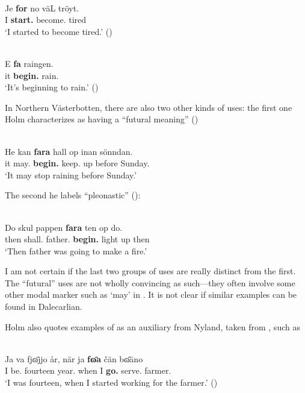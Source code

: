 \ea\label{}
\\
\gll Je  \textbf{for} no  väL  tröyt.\\
I  \textbf{start.{\pst}} {\prag}  become.{\inf}  tired\\
\glt ‘I started to become tired.’ (\citealt[19]{Holm1942})
\z

\ea\label{}
\\
\gll E  \textbf{fa} raingen.\\
it  \textbf{begin.{\prs}} rain.{\inf}\\
\glt ‘It’s beginning to rain.’ (\citealt[115]{Levander1909})
\z

In Northern Västerbotten, there are also two other kinds of uses: the first one Holm characterizes as having a “futural meaning” (\citealt[20]{Holm1941})

\ea\label{}
\\
\gll He  kan  \textbf{fara} hall  op  inan  sönndan.\\
it  may.{\prs}  \textbf{begin.{\inf}} keep.{\inf}  up  before  Sunday.{}\\
\glt  ‘It may stop raining before Sunday.’
\z

The second he labels “pleonastic” (\citealt[21]{Holm1941}):


\ea\label{}
\\
\gll Do  skul  pappen  \textbf{fara} ten  op  do.\\
then  shall.{\pst}  father.{}  \textbf{begin.{\inf}} light  up  then\\
\glt ‘Then father was going to make a fire.’
\z

I am not certain if the last two groups of uses are really distinct from the first. The “futural” uses are not wholly convincing as such—they often involve some other modal marker such as  ‘may’ in . It is not clear if similar examples can be found in Dalecarlian. 

Holm also quotes examples of  as an auxiliary from Nyland, taken from \citet{Lundström1939}, such as

\ea\label{}
\\
\gll Ja  va  fj\={ɷ}jjo   år,  när  ja  \textbf{f\={ɷ}a} čän  b\={ɷ}äno   \\
I  be.{\pst}  fourteen  year.{\pl}  when  I  \textbf{go.{\pst}} serve.{\inf}  farmer.{}  \\
\glt ‘I was fourteen, when I started working for the farmer.’ (\citealt[133]{Lundström1939})
\z

